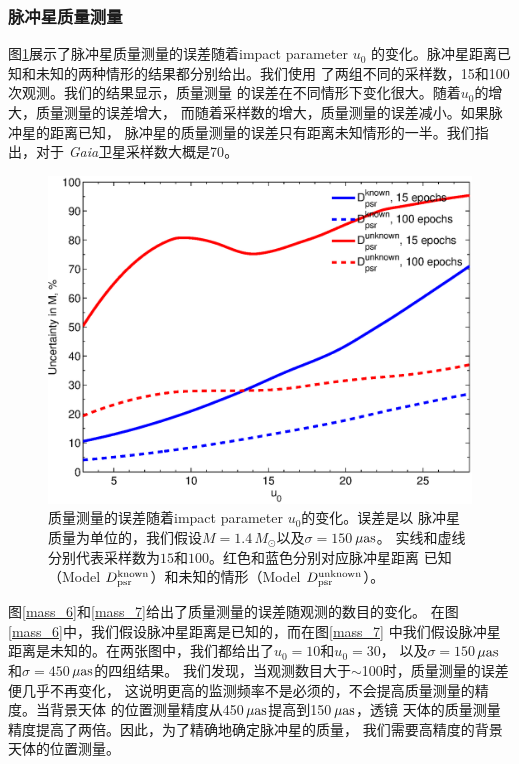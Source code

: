 \subsubsection{脉冲星质量测量}


图\ref{mass_u0}展示了脉冲星质量测量的误差随着impact parameter $u_0$
的变化。脉冲星距离已知和未知的两种情形的结果都分别给出。我们使用
了两组不同的采样数，15和100次观测。我们的结果显示，质量测量
的误差在不同情形下变化很大。随着$u_0$的增大，质量测量的误差增大，
而随着采样数的增大，质量测量的误差减小。如果脉冲星的距离已知，
脉冲星的质量测量的误差只有距离未知情形的一半。我们指出，对于
\textit{Gaia}卫星采样数大概是70\supercite{DeBruijne12}。
%
\begin{figure}
\begin{center}
  \includegraphics[width=4 in,trim=0 0 0 3.2cm]{u0_mass.eps}
%
\caption{质量测量的误差随着impact parameter $u_0$的变化。误差是以
脉冲星质量为单位的，我们假设$M=1.4$\,$M_{\odot}$以及$\sigma=150$\,$\rm{\mu as}$。
实线和虚线分别代表采样数为$15$和$100$。红色和蓝色分别对应脉冲星距离
已知（Model $D_{\rm{psr}}^{\rm{known}}$）和未知的情形（Model $D_{\rm{psr}}^{\rm{unknown}}$）。
}
\label{mass_u0}
\end{center}
\end{figure}

图\ref{mass_6}和\ref{mass_7}给出了质量测量的误差随观测的数目的变化。
在图\ref{mass_6}中，我们假设脉冲星距离是已知的，而在图\ref{mass_7}
中我们假设脉冲星距离是未知的。在两张图中，我们都给出了$u_0=10$和$u_0=30$，
以及$\sigma=150$\,$\rm{\mu as}$和$\sigma=450$\,$\rm{\mu as}$的四组结果。
我们发现，当观测数目大于$\sim$100时，质量测量的误差便几乎不再变化，
这说明更高的监测频率不是必须的，不会提高质量测量的精度。当背景天体
的位置测量精度从450\,$\rm{\mu as}$提高到150\,$\rm{\mu as}$，透镜
天体的质量测量精度提高了两倍。因此，为了精确地确定脉冲星的质量，
我们需要高精度的背景天体的位置测量。

